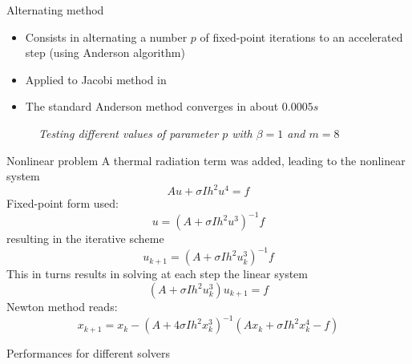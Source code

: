 \documentclass{beamer}
\begin{document}
			

				
			\begin{frame}[fragile]{Alternating method}
				\begin{itemize}
					\item Consists in alternating a number $p$ of fixed-point iterations to an accelerated step (using Anderson algorithm)
					\item Applied to Jacobi method in \cite{Pratapa}
					\item The standard Anderson method converges in
			about $0.0005 s$
				\end{itemize}

			\begin{figure}
			{\scriptsize
			\resizebox{!}{3.5cm}{
			}}
			\caption{\textit{Testing different values of parameter $p$ with $\beta=1$ and $m=8$}}
			\centering
			\end{figure}

			\end{frame}
				
				\begin{frame}{Nonlinear problem}
						A thermal radiation term was added, leading to the nonlinear system
			\begin{equation*}
				A u + \sigma I h^2 u^4 = f
			\end{equation*}
			Fixed-point form used:
			\begin{equation*}
				u = (A+ \sigma I h^2 u^3)^{-1} f 
			\end{equation*}
			resulting in the iterative scheme
			\begin{equation*}
				u_{k+1}= (A+ \sigma I h^2 u^3_k)^{-1} f 
			\end{equation*}
			This in turns results in solving at each step the linear system
			\begin{equation*}
				(A+ \sigma I h^2 u^3_k) u_{k+1} = f
			\end{equation*}
			Newton method reads:
			\begin{equation*}
				x_{k+1}= x_k - (A+4 \sigma I h^2 x_k^3)^{-1}(A x_k + \sigma I h^2 x_k^4 - f)
			\end{equation*}
		
				\end{frame}
				
				\begin{frame}{Performances for different solvers}
			\begin{figure}
			{\scriptsize
			}
			\centering
			\end{figure}

				\end{frame}
				
\end{document}

